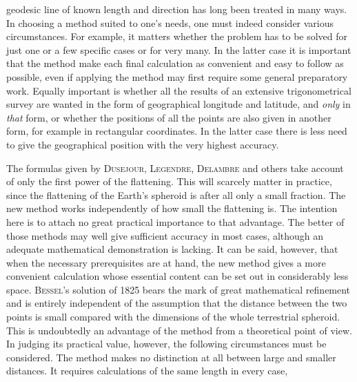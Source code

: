 %
geodesic line of known length and direction has long been treated in many ways. In choosing a method suited to one's needs, one must indeed consider various circumstances. For example, it matters whether the problem has to be solved for just one or a few specific cases or for very many. In the latter case it is important that the method make each final calculation as convenient and easy to follow as possible, even if applying the method may first require some general preparatory work. Equally important is whether all the results of an extensive trigonometrical survey are wanted in the form of geographical longitude and latitude, and \textit{only} in \textit{that} form, or whether the positions of all the points are also given in another form, for example in rectangular coordinates. In the latter case there is less need to give the geographical position with the very highest accuracy.

The formulas given by \textsc{Dusejour}, \textsc{Legendre}, \textsc{Delambre} and others take account of only the first power of the flattening. This will scarcely matter in practice, since the flattening of the Earth's spheroid is after all only a small fraction. The new method works independently of how small the flattening is. The intention here is to attach no great practical importance to that advantage. The better of those methods may well give sufficient accuracy in most cases, although an adequate mathematical demonstration is lacking. It can be said, however, that when the necessary prerequisites are at hand, the new method gives a more convenient calculation whose essential content can be set out in considerably less space. \textsc{Bessel}'s solution of 1825 bears the mark of great mathematical refinement and is entirely independent of the assumption that the distance between the two points is small compared with the dimensions of the whole terrestrial spheroid. This is undoubtedly an advantage of the method from a theoretical point of view. In judging its practical value, however, the following circumstances must be considered. The method makes no distinction at all between large and smaller distances. It requires calculations of the same length in every case,
